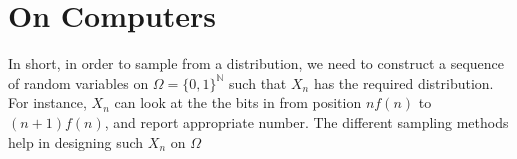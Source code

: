 \documentclass[11pt,a4paper]{article}
\theoremstyle{definition}
\theoremstyle{Example}
\newcommand{\set}[1]{\{#1\}}
\newcommand{\N}{\mathbb{N}}
\begin{document}
	
	
	\section{On Computers}
	In short, in order to sample from a distribution, we need to construct a sequence of random variables on $ \Omega = \set{0,1}^\N $ such that $ X_n $ has the required distribution. For instance, $ X_n $ can look at the the bits in from position $ nf(n) $ to $ (n+1)f(n) $, and report appropriate number. The different sampling methods help in designing such $ X_n $ on $ \Omega $
\end{document}
